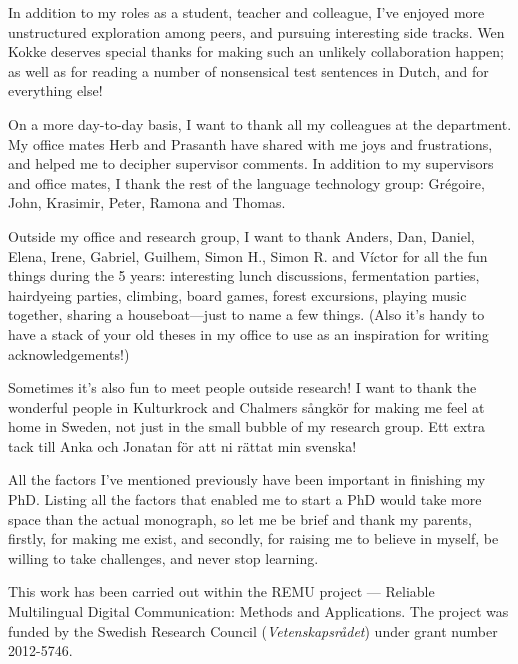 In addition to my roles as a student, teacher and colleague, I've enjoyed
more unstructured exploration among peers, and pursuing interesting side tracks.
Wen Kokke deserves special thanks for making such an unlikely collaboration
happen; as well as for reading a number of nonsensical test sentences in Dutch,
and for everything else!

On a more day-to-day basis, I want to thank all my colleagues at the
department. My office mates Herb and Prasanth have shared with me joys
and frustrations, and helped me to decipher supervisor comments. In
addition to my supervisors and office mates, I thank the rest of the language
technology group: Grégoire, John, Krasimir, Peter, Ramona and Thomas.

Outside my office and research group, I want to thank Anders, Dan, Daniel,
Elena, Irene, Gabriel, Guilhem, Simon H., Simon R. and Víctor for all the
fun things during the 5 years: interesting lunch discussions, fermentation
parties, hairdyeing parties, climbing, board games, forest excursions,
playing music together, sharing a houseboat---just to name a few
things. (Also it's handy to have a stack of your old theses in my
office to use as an inspiration for writing acknowledgements!)

Sometimes it's also fun to meet people outside research! I want to
thank the wonderful people in Kulturkrock and Chalmers sångkör for
making me feel at home in Sweden, not just in the small bubble of my
research group. Ett extra tack till Anka och Jonatan för att ni rättat
min svenska!

All the factors I've mentioned previously have been important in finishing
my PhD. Listing all the factors that enabled me to start a PhD would take
more space than the actual monograph, so let me be brief and thank my parents,
firstly, for making me exist, and secondly, for raising me to believe in myself,
be willing to take challenges, and never stop learning.

\vfill\noindent
This work has been carried out within the REMU project — Reliable Multilingual Digital Communication: Methods and Applications.
The project was funded by the Swedish Research Council (\emph{Vetenskapsrådet}) under grant number 2012-5746.
